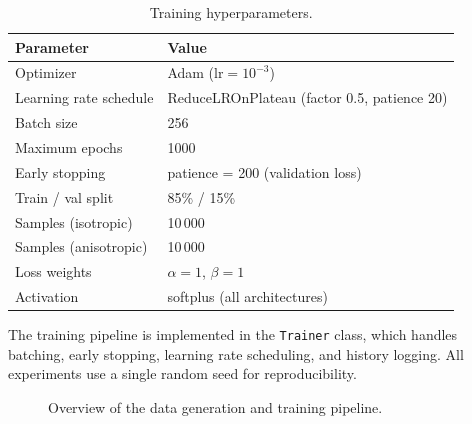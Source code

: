 \begin{table}[htbp]
\centering
\caption{Training hyperparameters.}
\label{tab:training_hyperparams}
\begin{tabular}{@{}ll@{}}
\toprule
\textbf{Parameter} & \textbf{Value} \\
\midrule
Optimizer          & Adam ($\text{lr} = 10^{-3}$) \\
Learning rate schedule & ReduceLROnPlateau (factor 0.5, patience 20) \\
Batch size         & 256 \\
Maximum epochs     & 1000 \\
Early stopping     & patience = 200 (validation loss) \\
Train / val split  & 85\% / 15\% \\
Samples (isotropic)   & 10\,000 \\
Samples (anisotropic) & 10\,000 \\
Loss weights       & $\alpha = 1$, $\beta = 1$ \\
Activation         & softplus (all architectures) \\
\bottomrule
\end{tabular}
\end{table}

The training pipeline is implemented in the \texttt{Trainer} class, which
handles batching, early stopping, learning rate scheduling, and history
logging.  All experiments use a single random seed for reproducibility.

\begin{figure}[htbp]
\centering
\caption{Overview of the data generation and training pipeline.}
\label{fig:training_pipeline}
\end{figure}
